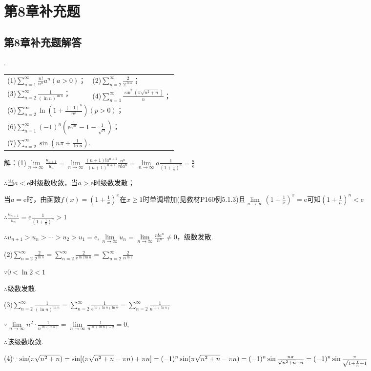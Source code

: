 \documentclass[12pt,UTF8]{ctexart}
\newcommand\Lim[0]{\lim\limits_{n\rightarrow\infty}}
\newcommand\Ser[1]{\sum_{n=#1}^\infty}
\newcommand{\me}[0]{\mathrm e}
\begin{document}
\def\thesection{13C}
\section{第8章补充题}
\def\thesubsection{\thesection.\arabic{subsection}}
\subsection{第8章补充题解答}
\begin{enumerate}
.

\begin{tabular}{ll}
(1)$\Ser{1}\frac{n!}{n^n}a^n(a>0)$；& (2)$\Ser{2}\frac2{2^{\ln n}}$；\\
(3)$\Ser{2}\frac1{(\ln n)^{\ln n}}$；& (4)$\Ser{1}\frac{\sin^2(\pi\sqrt{n^2+n})}n$；\\
\multicolumn{2}{l}{(5)$\Ser{2}\ln(1+\frac{(-1)^n}{n^p})(p>0)$；}\\
\multicolumn{2}{l}{(6)$\Ser{1}(-1)^n(\mathrm e^{\frac1{\sqrt n}}-1-\frac1{\sqrt n})$；}\\
\multicolumn{2}{l}{(7)$\Ser{2}\sin(n\pi+\frac1{\ln n})$.}
\end{tabular}

解：(1)$\Lim\frac{u_{n+1}}{u_n}=\Lim\frac{(n+1)!a^{n+1}}{(n+1)^{n+1}}\frac{n^n}{n!a^n}=\Lim a\frac1{(1+\frac1n)^n}=\frac a{\mathrm e}$

$\therefore$当$a<\mathrm e$时级数收敛，当$a>\mathrm e$时级数发散；

当$a=\mathrm e$时，由函数$f(x)=(1+\frac1x)^x$在$x\geq1$时单调增加(见教材P160例5.1.3)且$\Lim(1+\frac1x)^x=\mathrm e$可知$(1+\frac1n)^n<\mathrm e$

$\therefore\frac{u_{n+1}}{u_n}=\mathrm e\frac1{(1+\frac1n)^n}>1$

$\therefore u_{n+1}>u_n>\cdots>u_2>u_1=\mathrm e,\Lim u_n=\Lim\frac{n!a^n}{n^n}\neq0$，级数发散.

(2)$\Ser{2}\frac2{2^{\ln n}}=\Ser{2}\frac2{\me^{\ln2\ln n}}=\Ser{2}\frac2{n^{\ln2}}$

$\because0<\ln2<1$

$\therefore$级数发散.

(3)$\Ser{2}\frac1{(\ln n)^{\ln n}}=\Ser{2}\frac1{\me^{\ln(\ln n)\ln n}}=\Ser{2}\frac1{n^{\ln(\ln n)}}$

$\because\Lim n^2\cdot\frac1{n^{\ln(\ln n)}}=\Lim\frac1{n^{\ln(\ln n)-2}}=0$,

$\therefore$该级数收敛.

(4)$\because\sin(\pi\sqrt{n^2+n})=\sin[(\pi\sqrt{n^2+n}-\pi n)+\pi n]=(-1)^n\sin(\pi\sqrt{n^2+n}-\pi n)\\
=(-1)^n\sin\frac{n\pi}{\sqrt{n^2+n}+n}=(-1)^n\sin\frac{\pi}{\sqrt{1+\frac1n}+1}$


\end{enumerate}
\end{document}
